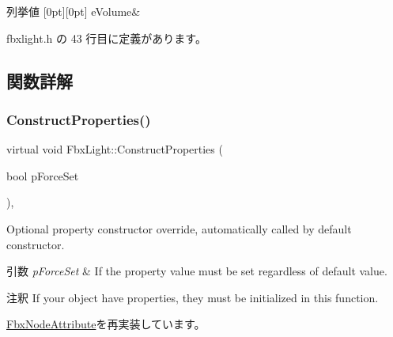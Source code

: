 \begin{DoxyEnumFields}{列挙値}
[0pt][0pt]{}\mbox{\label{class_fbx_light_ace4ba495501bddf1341600bea7ed8dafa736883e23926a35eb6dd8e22df64a207}} 
e\+Volume&\\
\hline

\end{DoxyEnumFields}


 fbxlight.\+h の 43 行目に定義があります。



\subsection{関数詳解}
\mbox{\label{class_fbx_light_aaa406a871272d3f36c6300ab81f312c5}} 
\subsubsection{\texorpdfstring{Construct\+Properties()}{ConstructProperties()}}
{\footnotesize\ttfamily virtual void Fbx\+Light\+::\+Construct\+Properties (\begin{DoxyParamCaption}\item[{bool}]{p\+Force\+Set }\end{DoxyParamCaption})\hspace{0.3cm}{\ttfamily [protected]}, {\ttfamily [virtual]}}

Optional property constructor override, automatically called by default constructor. 
\begin{DoxyParams}{引数}
{\em p\+Force\+Set} & If the property value must be set regardless of default value. \\
\hline
\end{DoxyParams}
\begin{DoxyRemark}{注釈}
If your object have properties, they must be initialized in this function. 
\end{DoxyRemark}


\hyperlink{class_fbx_node_attribute_a042eb9949a9b9634dcc5f126e82fd04a}{Fbx\+Node\+Attribute}を再実装しています。

\mbox{\label{class_fbx_light_a0a0ef9dd3eacb2cadb30416d13ea8e7d}} 
